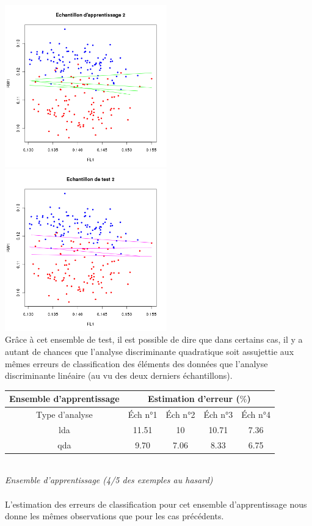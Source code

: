 \documentclass[a4paper, 10pt]{article}
\begin{document}
\includegraphics[height = 7cm, width = 7cm]{plots/exo2_a_20.png}
\includegraphics[height = 7cm, width = 7cm]{plots/exo2_a_21.png}\\
Grâce à cet ensemble de test, il est possible de dire que dans certains cas, il y a autant de chances que l'analyse discriminante quadratique
soit assujettie aux mêmes erreurs de classification des éléments des données que l'analyse discriminante linéaire
(au vu des deux derniers échantillons).
\newpage \noindent
\begin{tabular}{|c|c|c|c|c|}
\hline
\textbf{Ensemble d'apprentissage} & \multicolumn{4}{|c|}{Estimation d'erreur ($\%$)} \\
\hline
Type d'analyse & Éch n°1 & Éch n°2 & Éch n°3 & Éch n°4 \\
\hline
lda & 11.51 & 10 & 10.71 & 7.36 \\
\hline
qda & 9.70 & 7.06 & 8.33 & 6.75 \\
\hline
\end{tabular}\\
\textit{Ensemble d'apprentissage (4/5 des exemples au hasard)}\\ \\
L'estimation des erreurs de classification pour cet ensemble d'apprentissage nous donne les mêmes observations que pour les cas précédents.\\ \\
\end{document}
